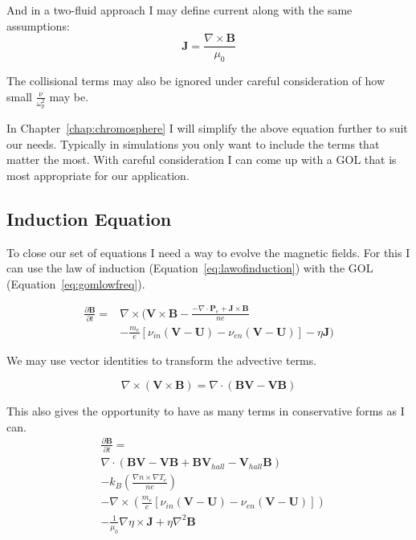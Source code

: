 \documentclass[12pt,upcase]{umlthesis}
\begin{document}
And in a two-fluid approach I may define current along with the same assumptions:
\begin{equation}
	\textbf{J} = \frac{\nabla\times\textbf{B}}{\mu_0}
\end{equation}

The collisional terms may also be ignored under careful consideration of how small $\frac{\nu}{\omega^2_p}$ may be.

In Chapter~\ref{chap:chromosphere} I will simplify the above equation further to suit our needs. Typically in simulations you only want to include the terms that matter the most. With careful consideration I can come up with a GOL that is most appropriate for our application.

\subsection{Induction Equation}

To close our set of equations I need a way to evolve the magnetic fields. For this I can use the law of induction (Equation~\ref{eq:lawofinduction}) with the GOL (Equation~\ref{eq:gomlowfreq}).

\begin{equation}
	\begin{aligned}
		\frac{\partial\textbf{B}}{\partial t} =& \nabla\times(\textbf{V}\times\textbf{B} - \frac{-\nabla\cdot\textbf{P}_e + \textbf{J}\times\textbf{B}}{ne} \\
						       &- \frac{m_e}{e}[\nu_{in} (\textbf{V}-\textbf{U}) - \nu_{en}(\textbf{V} - \textbf{U})] - \eta\textbf{J})
\end{aligned}
\end{equation}

We may use vector identities to transform the advective terms.

\begin{equation}
	\nabla\times(\textbf{V}\times\textbf{B}) = \nabla\cdot(\textbf{BV}-\textbf{VB})
\end{equation}

This also gives the opportunity to have as many terms in conservative forms as I can.
\begin{equation}\label{eq:inductionequation}
	\begin{aligned}
		& \frac{\partial\textbf{B}}{\partial t} = \\
		&\nabla\cdot(\textbf{BV}-\textbf{VB} + \textbf{B}\textbf{V}_{hall}-\textbf{V}_{hall}\textbf{B}) \\
		&-k_B (\frac{\nabla n \times \nabla T_e}{ne}) \\
		&- \nabla\times(\frac{m_e}{e}[\nu_{in} (\textbf{V}-\textbf{U}) - \nu_{en}(\textbf{V} - \textbf{U})]) \\
		& - \frac{1}{\mu_0} \nabla\eta\times\textbf{J} + \eta\nabla^2\textbf{B}
\end{aligned}
\end{equation}
\end{document}
